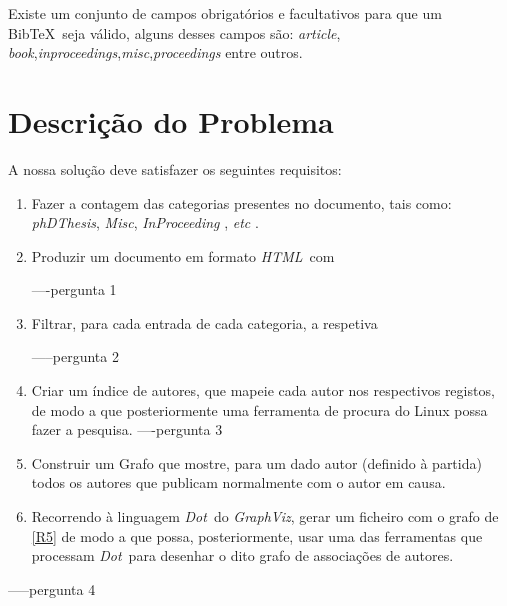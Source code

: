 \documentclass[11pt,a4paper]{report}
\begin{document}
Existe um conjunto de campos obrigatórios e facultativos para que um Bib\TeX \ seja válido, alguns desses campos são: \emph{article}, \emph{book},\emph{inproceedings},\emph{misc},\emph{proceedings} entre outros.



\newpage

\section{Descrição do Problema}
\newcommand{\gv}{\emph{GraphViz}}
\newcommand{\htlm}{\emph{HTML}}
\newcommand{\dott}{\emph{Dot}}
\newcommand{\bib}{Bib\TeX}



A nossa solução deve satisfazer os seguintes requisitos: 
\begin{enumerate}[label=R\arabic*]
\item\label{R1} Fazer a contagem das categorias presentes no documento, tais como: \emph{phDThesis}, \emph{Misc}, \emph{InProceeding }, \emph{etc }.
\item\label{R2}Produzir um documento em formato \htlm \ com
----pergunta 1 
\item\label{R3} Filtrar, para cada entrada de cada categoria, a respetiva
-----pergunta 2
\item\label{R4} Criar um índice de autores, que mapeie cada autor nos respectivos registos, de modo a que posteriormente uma ferramenta de procura do Linux possa fazer a pesquisa.
----pergunta 3
\item\label{R5} Construir um Grafo que mostre, para um dado autor (definido à partida) todos os autores que publicam normalmente com o autor em causa.
\item\label{R6}Recorrendo à linguagem \dott \  do \gv, gerar um ficheiro com o grafo de \ref{R5} de modo a que possa, posteriormente, usar uma das ferramentas que processam \dott \  para desenhar o dito grafo de associações de autores.
\end{enumerate}
-----pergunta 4
\end{document}
